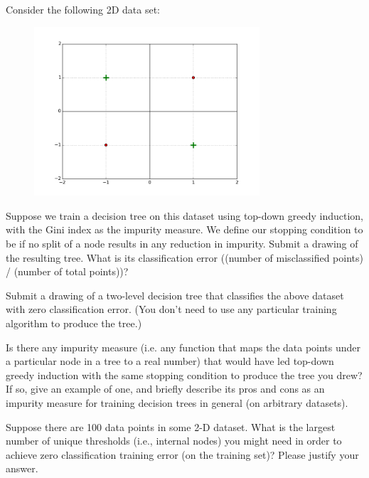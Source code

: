 \newpage

\problem[15]
Consider the following 2D data set:
\begin{figure}[H]
    \begin{center}
    \includegraphics[width=3.3in]{plots/3C.png}
    \end{center}
\end{figure}

\subproblem[5] Suppose we train a decision tree on this dataset using top-down greedy induction, with the Gini index as
the impurity measure. We define our stopping condition to be if no split of a node
results in any reduction in impurity. Submit a drawing of the resulting tree.  What is its classification error ((number of misclassified points) / (number of total points))?

\subproblem[5] Submit a drawing of a two-level decision tree that classifies the above dataset with zero classification error.  (You don't need to use any particular training algorithm to produce the tree.)

Is there any impurity measure (i.e. any function that maps the data points under a particular node in a tree to a real number) that would have led top-down greedy induction with the same stopping condition to produce the tree you drew?  If so, give an example of one, and briefly describe its pros and cons as an impurity measure for training decision trees in general (on arbitrary datasets). 

\subproblem[5] Suppose there are 100 data points in some 2-D dataset. What is the largest number of unique thresholds (i.e., internal nodes) you might need in order to achieve zero classification training error (on the training set)? Please
justify your answer.

